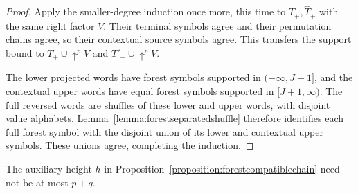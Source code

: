 \documentclass{amsart}
\theoremstyle{definition}
\theoremstyle{remark}
\numberwithin{equation}{subsection}
\newcommand{\shup}{{\uparrow}}
\begin{document}
\begin{proof}
Apply the smaller-degree induction once more, this time to $T_+,\widehat T_+$ with the same right factor $V$. Their terminal symbols agree and their permutation chains agree, so their contextual source symbols agree. This transfers the support bound to $T_+\cup\shup^pV$ and $T'_+\cup\shup^pV$.

The lower projected words have forest symbols supported in $(-\infty,J-1]$, and the contextual upper words have equal forest symbols supported in $[J+1,\infty)$. The full reversed words are shuffles of these lower and upper words, with disjoint value alphabets. Lemma~\ref{lemma:forestseparatedshuffle} therefore identifies each full forest symbol with the disjoint union of its lower and contextual upper symbols. These unions agree, completing the induction.
\end{proof}

The auxiliary height $h$ in Proposition~\ref{proposition:forestcompatiblechain} need not be at most $p+q$.
\end{document}
